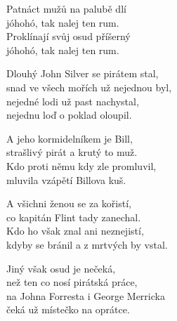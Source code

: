 
\cho{}
Patnáct mužů na palubě dlí\\
jóhohó, tak nalej ten rum.\\
Proklínají svůj osud příšerný\\
jóhohó, tak nalej ten rum.

\ve{}Dlouhý John Silver se pirátem stal,\\
snad ve všech mořích už nejednou byl,\\
nejedné lodi už past nachystal,\\
nejednu loď o poklad oloupil.

\cho{}

\ve{}
A jeho kormidelníkem je Bill,\\
strašlivý pirát a krutý to muž.\\
Kdo proti němu kdy zle promluvil,\\
mluvila vzápětí Billova kuš.

\cho{}

\ve{}
A všichni ženou se za kořistí,\\
co kapitán Flint tady zanechal.\\
Kdo ho však znal ani neznejistí,\\
kdyby se bránil a z mrtvých by vstal.

\cho{}

\ve{}
Jiný však osud je nečeká,\\
než ten co nosí pirátská práce,\\
na Johna Forresta i George Merricka\\
čeká už místečko na oprátce.

\cho{}

\esong